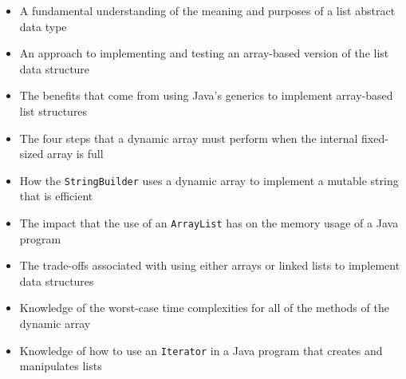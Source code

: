 \documentclass[11pt]{article}
\newcommand{\program}[1]{\lstinline{#1}}
\begin{document}
\begin{itemize}

  \setlength{\itemsep}{0.05in}

  \item A fundamental understanding of the meaning and purposes of a list
    abstract data type

  \item An approach to implementing and testing an array-based version of the
    list data structure

  \item The benefits that come from using Java's generics to implement
    array-based list structures

  \item The four steps that a dynamic array must perform when the internal
    fixed-sized array is full

  \item How the \program{StringBuilder} uses a dynamic array to implement
    a mutable string that is efficient

  \item The impact that the use of an \program{ArrayList} has on the memory
    usage of a Java program

  \item The trade-offs associated with using either arrays or linked lists to implement data structures

  \item Knowledge of the worst-case time complexities for all of the methods
    of the dynamic array

  \item Knowledge of how to use an \program{Iterator} in a Java program that
    creates and manipulates lists


\end{itemize}
\end{document}
